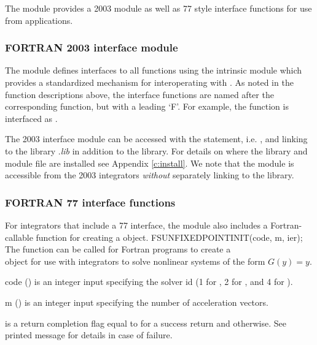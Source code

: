 The {\sunnonlinsolfixedpoint} module provides a {\F} 2003 module as well as
{\F} 77 style interface functions for use from {\F} applications.

\subsubsection*{FORTRAN 2003 interface module}
The  {\F} module defines interfaces to all
{\sunnonlinsolfixedpoint} {\CC} functions using the intrinsic 
module which provides a standardized mechanism for interoperating with {\CC}. As
noted in the {\CC} function descriptions above, the interface functions are
named after the corresponding {\CC} function, but with a leading `F'. For
example, the function  is interfaced as
.

The {\F} 2003 {\sunnonlinsolfixedpoint} interface module can be accessed with the 
statement, i.e. , and linking to the library
.{\em lib} in addition to the {\CC} library. For details on where the library and module file
 are installed see Appendix \ref{c:install}.
We note that the module is accessible from the {\F} 2003 {\sundials} integrators
\textit{without} separately linking to the
 library.

\subsubsection*{FORTRAN 77 interface functions}
For {\sundials} integrators that include a {\F} 77 interface, the
{\sunnonlinsolfixedpoint} module also includes a Fortran-callable
function for creating a  object.
%
%
{
  FSUNFIXEDPOINTINIT(code, m, ier);
}
{
  The function  can be called for Fortran programs
  to create a\\
   object for use with {\sundials}
  integrators to solve nonlinear systems of the form $G(y) = y$.
}
{
  \begin{args}[code]
  \item[code] ()
    is an integer input specifying the solver id (1 for {\cvode}, 2
    for {\ida}, and 4 for {\arkode}).
  \item[m] ()
    is an integer input specifying the number of acceleration vectors.
  \end{args}
}
{
   is a return completion flag equal to  for a success
  return and  otherwise. See printed message for details in case
  of failure.
}
{}


